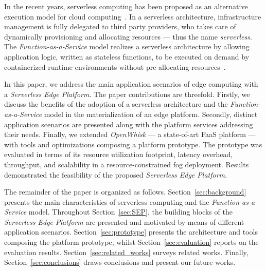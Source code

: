 
In the recent years, serverless computing has been proposed as an alternative execution model for cloud computing~\cite{Lloyd18serverless}. In a serverless architecture, infrastructure management is fully delegated to third party providers, who takes care of dynamically provisioning and allocating resources --- thus the name \textit{serverless}. The \textit{Function-as-a-Service} model realizes a serverless architecture by allowing application logic, written as stateless functions, to be executed on demand by containerized runtime environments without pre-allocating resources~\cite{Roberts:2018}. 

In this paper, we address the main application scenarios of edge computing with a \textit{Serverless Edge Platform}. The paper contributions are threefold. Firstly, we discuss the benefits of the adoption of a serverless architecture and the \textit{Function-as-a-Service} model in the materialization of an edge platform. Secondly, distinct application scenarios are presented along with 
the platform services addressing their needs. Finally, we extended \textit{OpenWhisk} --- a state-of-art FaaS platform --- with tools and optimizations composing a platform prototype. 
The prototype was evaluated in terms of its resource utilization footprint, latency overhead, throughput, and scalability in a resource-constrained fog deployment. Results demonstrated the feasibility of the proposed \textit{Serverless Edge Platform}.%


The remainder of the paper is organized as follows. Section~\ref{sec:background} presents the main characteristics of serverless computing and the \textit{Function-as-a-Service} model.
Throughout Section~\ref{sec:SEP}, the building blocks of the \textit{Serverless Edge Platform} are presented and motivated by means of different application scenarios. Section~\ref{sec:prototype} presents the architecture and tools composing the platform prototype, whilst Section~\ref{sec:evaluation} reports on the evaluation results. Section~\ref{sec:related_works} surveys related works. Finally, Section~\ref{sec:conclusions} draws conclusions and present our future works.

